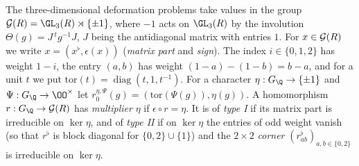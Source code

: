 The three-dimensional deformation problems take values in the group
$\modularityG(R)=\GL_3(R)\rtimes\{\pm1\}$, where $-1$ acts on $\GL_3(R)$ by the involution
$\Theta(g)=J\,{}^tg^{-1}J$, $J$ being the antidiagonal matrix with entries $1$.
For $x\in\mathcal G(R)$ we write $x=(x^\flat,\epsilon(x))$ (\emph{matrix part} and \emph{sign}). The index $i\in\{0,1,2\}$
has weight $1-i$, the entry $(a,b)$ has weight $(1-a)-(1-b)=b-a$, and for a unit $t$ we put
$\mathrm{tor}(t)=\operatorname{diag}(t,1,t^{-1})$. For a character $\eta:G_\Q\to\{\pm1\}$ and
$\Psi:G_\Q\to\OO^\times$ let $r_0^{\eta,\Psi}(g)=(\mathrm{tor}(\Psi(g)),\eta(g))$. A homomorphism
$r:G_\Q\to\modularityG(R)$ has \emph{multiplier} $\eta$ if $\epsilon\circ r=\eta$. It is of \emph{type I} if its matrix
part is irreducible on $\ker\eta$, and of \emph{type II} if on $\ker\eta$ the entries of odd weight vanish (so that
$r^\flat$ is block diagonal for $\{0,2\}\cup\{1\}$) and the $2\times2$ \emph{corner} $(r^\flat_{ab})_{a,b\in\{0,2\}}$ is
irreducible on $\ker\eta$.

